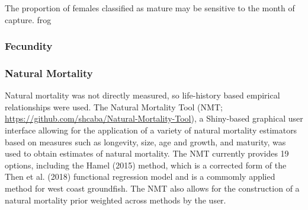 \documentclass[11pt,
  english,
  a4paper,
]{article}
\begin{document}
The proportion of females classified as mature may be sensitive to the month of capture. frog


\hypertarget{fecundity}{%
\subsubsection{Fecundity}\label{fecundity}}

\leavevmode\tagmcend\tagstructend


\hypertarget{natural-mortality}{%
\subsubsection{Natural Mortality}\label{natural-mortality}}

\leavevmode\tagmcend\tagstructend

Natural mortality was not directly measured, so life-history based empirical relationships were used. The Natural Mortality Tool (NMT; {\url{https://github.com/shcaba/Natural-Mortality-Tool}\leavevmode\tagmcend\tagstructend}), a Shiny-based graphical user interface allowing for the application of a variety of natural mortality estimators based on measures such as longevity, size, age and growth, and maturity, was used to obtain estimates of natural mortality. The NMT currently provides 19 options, including the Hamel {(2015)\leavevmode\tagmcend\tagstructend} method, which is a corrected form of the Then et al. {(2018)\leavevmode\tagmcend\tagstructend} functional regression model and is a commomly applied method for west coast groundfish. The NMT also allows for the construction of a natural mortality prior weighted across methods by the user.
\end{document}
